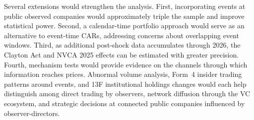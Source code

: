 Several extensions would strengthen the analysis. First, incorporating events at public observed companies would approximately triple the sample and improve statistical power. Second, a calendar-time portfolio approach would serve as an alternative to event-time CARs, addressing concerns about overlapping event windows. Third, as additional post-shock data accumulates through 2026, the Clayton Act and NVCA 2025 effects can be estimated with greater precision. Fourth, mechanism tests would provide evidence on the channels through which information reaches prices. Abnormal volume analysis, Form~4 insider trading patterns around events, and 13F institutional holdings changes would each help distinguish among direct trading by observers, network diffusion through the VC ecosystem, and strategic decisions at connected public companies influenced by observer-directors.
